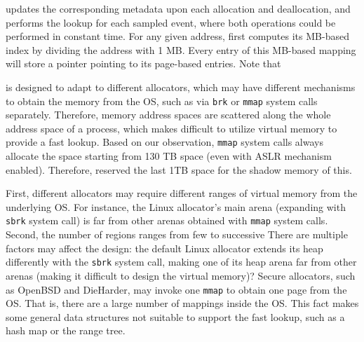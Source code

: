 \MP{} updates the corresponding metadata upon each allocation and deallocation, and performs the lookup for each sampled event, where both operations could be performed in constant time. For any given address, \MP{} first computes its MB-based index by dividing the address with 1 MB. Every entry of this MB-based mapping will store a pointer pointing to its page-based entries. 
Note that    

\MP{} is designed to adapt to different allocators, which may have different mechanisms to obtain the memory from the OS, such as via \texttt{brk} or \texttt{mmap} system calls separately. Therefore, memory address spaces are scattered along the whole address space of a process, which makes difficult to utilize virtual memory to provide a fast lookup. Based on our observation, \texttt{mmap} system calls always allocate the space starting from 130 TB space (even with ASLR mechanism enabled). Therefore, \MP{} reserved the last 1TB space for the shadow memory of this.   

First, different allocators may require different ranges of virtual memory from the underlying OS. For instance, the Linux allocator's main arena (expanding with \texttt{sbrk} system call) is far from other arenas obtained with \texttt{mmap} system calls. Second, the number of regions ranges from few to successive   
There are multiple factors may affect the design: the default Linux allocator extends its heap differently with the \texttt{sbrk} system call, making one of its heap arena far from other arenas (making it difficult to design the virtual memory)? Secure allocators, such as OpenBSD and DieHarder, may invoke one \texttt{mmap} to obtain one page from the OS. That is, there are a large number of mappings inside the OS. This fact makes some general data structures not suitable to support the fast lookup, such as a hash map or the range tree.
